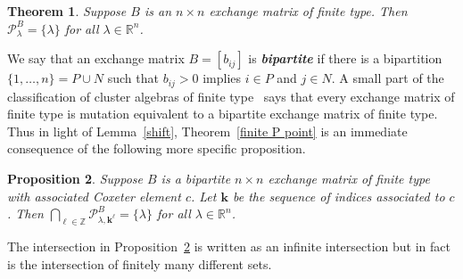 \documentclass{amsart}
\newtheorem{proposition}{Proposition}[section]
\newtheorem{theorem}[proposition]{Theorem}
\theoremstyle{definition}
\theoremstyle{remark}
\numberwithin{equation}{section}
\newcommand{\newword}[1]{\textbf{\emph{#1}}}
\newcommand{\integers}{\mathbb Z}
\newcommand{\reals}{\mathbb R}
\newcommand{\set}[1]{{\lbrace #1 \rbrace}}
\newcommand{\0}{{\mathbf{0}}}
\newcommand{\kk}{{\boldsymbol{k}}}
\renewcommand{\P}{\mathcal{P}}
\begin{document}
\begin{theorem}\label{finite P point no}  
Suppose $B$ is an $n\times n$ exchange matrix of finite type.
Then ${\P^B_\lambda=\set{\lambda}}$ for all $\lambda\in\reals^n$.
\end{theorem}

We say that an exchange matrix $B=[b_{ij}]$ is \newword{bipartite} if there is a bipartition $\set{1,\ldots,n}=P\cup N$ such that $b_{ij}>0$ implies $i\in P$ and $j\in N$.
A small part of the classification of cluster algebras of finite type~\cite{ca2} says that every exchange matrix of finite type is mutation equivalent to a bipartite exchange matrix of finite type.
Thus in light of Lemma~\ref{shift}, Theorem~\ref{finite P point} is an immediate consequence of the following more specific proposition.

\begin{proposition}\label{finite P point bip}
Suppose $B$ is a bipartite $n\times n$ exchange matrix of finite type with associated Coxeter element $c$.
Let $\kk$ be the sequence of indices associated to $c$.
Then $\bigcap_{\ell\in\integers}\P^B_{\lambda,\kk^\ell}=\set{\lambda}$ for all $\lambda\in\reals^n$.
\end{proposition}

The intersection in Proposition~\ref{finite P point bip} is written as an infinite intersection but in fact is the intersection of finitely many different sets.
\end{document}
